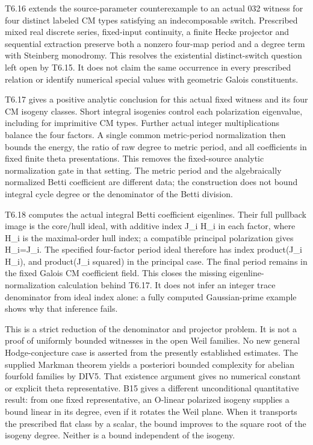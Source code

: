 \documentclass[11pt,a4paper]{article}
\theoremstyle{definition}
\begin{document}
T6.16 extends the source-parameter counterexample to an actual 032
witness for four distinct labeled CM types satisfying an indecomposable
switch. Prescribed mixed real discrete series, fixed-input continuity, a
finite Hecke projector and sequential extraction preserve both a nonzero
four-map period and a degree term with Steinberg monodromy. This
resolves the existential distinct-switch question left open by T6.15. It
does not claim the same occurrence in every prescribed relation or
identify numerical special values with geometric Galois constituents.

T6.17 gives a positive analytic conclusion for this actual fixed witness
and its four CM isogeny classes. Short integral isogenies control each
polarization eigenvalue, including for imprimitive CM types. Further
actual integer multiplications balance the four factors. A single common
metric-period normalization then bounds the energy, the ratio of raw
degree to metric period, and all coefficients in fixed finite theta
presentations. This removes the fixed-source analytic normalization gate
in that setting. The metric period and the algebraically normalized
Betti coefficient are different data; the construction does not bound
integral cycle degree or the denominator of the Betti division.

T6.18 computes the actual integral Betti coefficient eigenlines. Their
full pullback image is the core/hull ideal, with additive index J\_i
H\_i in each factor, where H\_i is the maximal-order hull index; a
compatible principal polarization gives H\_i=J\_i. The specified
four-factor period ideal therefore has index product(J\_i H\_i), and
product(J\_i squared) in the principal case. The final period remains in
the fixed Galois CM coefficient field. This closes the missing
eigenline-normalization calculation behind T6.17. It does not infer an
integer trace denominator from ideal index alone: a fully computed
Gaussian-prime example shows why that inference fails.

This is a strict reduction of the denominator and projector problem. It
is not a proof of uniformly bounded witnesses in the open Weil families.
No new general Hodge-conjecture case is asserted from the presently
established estimates. The supplied Markman theorem yields a posteriori
bounded complexity for abelian fourfold families by DIV5. That existence
argument gives no numerical constant or explicit theta representative.
B15 gives a different unconditional quantitative result: from one fixed
representative, an O-linear polarized isogeny supplies a bound linear in
its degree, even if it rotates the Weil plane. When it transports the
prescribed flat class by a scalar, the bound improves to the square root
of the isogeny degree. Neither is a bound independent of the isogeny.
\end{document}
